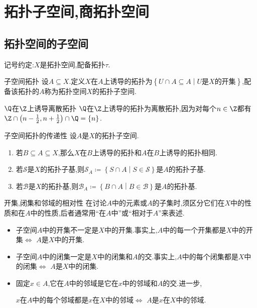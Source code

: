 \chapter{拓扑子空间,商拓扑空间}

\section{拓扑空间的子空间}

记号约定:$X$是拓扑空间,配备拓扑$\tau$.

\begin{definition}{子空间拓扑}{}
	设$A\subseteq X$.定义$X$在$A$上诱导的拓扑为$\left\{U\cap A\subseteq A\middle|U\text{是}X\text{的开集}\right\}$,配备该拓扑的$A$称为拓扑空间$X$的拓扑子空间.
\end{definition}

\begin{example}{$\Q$在$\Z$上诱导离散拓扑}{}
	$\Q$在$\Z$上诱导的拓扑为离散拓扑,因为对每个$n\in\Z$都有$\Z\cap\left(n-\frac{1}{2},n+\frac{1}{2}\right)\cap\Q=\left\{n\right\}$.
\end{example}

\begin{proposition}{子空间拓扑的传递性}{}
	设$A$是$X$的拓扑子空间.
	\begin{enumerate}
		\item 若$B\subseteq A\subseteq X$,那么$X$在$B$上诱导的拓扑和$A$在$B$上诱导的拓扑相同.
		\item 若$\mathcal{S}$是$X$的拓扑子基,则$\mathcal{S}_{A}\coloneq\left\{S\cap A\middle|S\in\mathcal{S}\right\}$是$A$的拓扑子基.
		\item 若$\mathcal{B}$是$X$的拓扑基,则$\mathcal{B}_{A}\coloneq\left\{B\cap A\middle|B\in\mathcal{B}\right\}$是$A$的拓扑基.
	\end{enumerate}
\end{proposition}

\begin{remark}{开集,闭集和邻域的相对性}{}
	在讨论$A$中的元素或$A$的子集时,须区分它们在$X$中的性质和在$A$中的性质,后者通常用``在$A$中''或``相对于$A$''来表述.
	\begin{itemize}
		\item 子空间$A$中的开集不一定是$X$中的开集.事实上,$A$中的每一个开集都是$X$中的开集$\iff$ $A$是$X$中的开集.
		\item 子空间$A$中的闭集一定是$X$中的闭集和$A$的交.事实上,$A$中的每个闭集都是$X$中的闭集$\iff$ $A$是$X$中的闭集.
		\item 固定$x\in A$,它在$A$中的邻域是它在$x$中的邻域和$A$的交.进一步,
		\begin{center}
			$x$在$A$中的每个邻域都是$x$在$X$中的邻域$\iff$ $A$是$x$在$X$中的邻域.
		\end{center}
	\end{itemize}
\end{remark}

